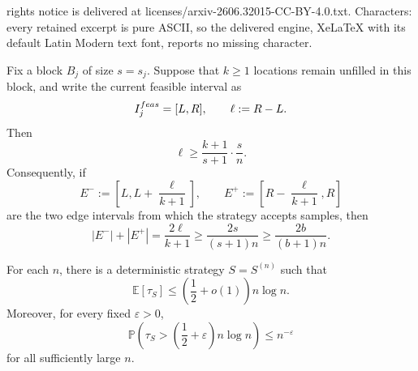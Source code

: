 \documentclass[10pt,a4paper]{amsart}
\newcommand{\eps}{\varepsilon}
\newcommand{\mb}{\mathbb}
\renewcommand{\P}{\mathbb{P}}
\begin{document}
rights notice is delivered at licenses/arxiv-2606.32015-CC-BY-4.0.txt. Characters: every retained excerpt is pure ASCII, so the delivered engine, XeLaTeX with its default Latin Modern text font, reports no missing character.
\begin{lemma}\label{lem:feasible-length}
Fix a block \(B_j\) of size \(s=s_j\). Suppose that \(k\ge1\) locations remain unfilled in this block, and write the current feasible interval as
\[
I_j^{\rm feas}=[L,R],
\qquad
\ell:=R-L.
\]
Then
\[
\ell\ge \frac{k+1}{s+1}\cdot \frac{s}{n}.
\]
Consequently, if
\[
E^-:=\left[L,L+\frac{\ell}{k+1}\right],
\qquad
E^+:=\left[R-\frac{\ell}{k+1},R\right]
\]
are the two edge intervals from which the strategy accepts samples, then
\[
|E^-|+|E^+|
=
\frac{2\ell}{k+1}
\ge
\frac{2s}{(s+1)n}
\ge
\frac{2b}{(b+1)n}.
\]
\end{lemma}

\begin{proposition}\label{prop:upper-explicit}
For each \(n\), there is a deterministic strategy \(S=S^{(n)}\) such that
\[
\mb{E}[\tau_{S}]\le \left(\frac12+o(1)\right)n\log n.
\]
Moreover, for every fixed \(\eps>0\),
\[
\P\left(\tau_{S}>\left(\frac12+\eps\right)n\log n\right)\le n^{-\eps}
\]
for all sufficiently large \(n\).
\end{proposition}
\end{document}
